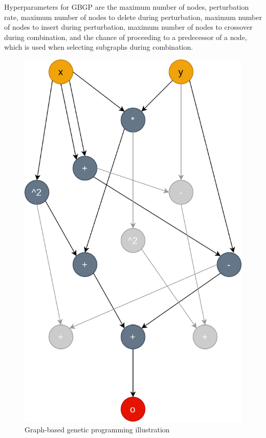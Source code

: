Hyperparameters for GBGP are the maximum number of nodes, perturbation rate, maximum number of nodes to delete during perturbation, maximum number of nodes to insert during perturbation, maximum number of nodes to crossover during combination, and the chance of proceeding to a predecessor of a node, which is used when selecting subgraphs during combination.

\begin{figure}[!htbp]
	\centering
	\includegraphics[scale=0.3]{../images/gbgp.png}
	\caption{Graph-based genetic programming illustration}
    \label{fig:gbgp}
\end{figure}

